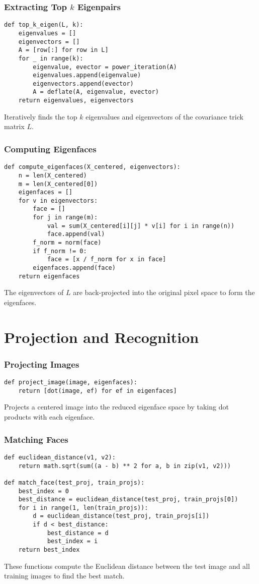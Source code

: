 \documentclass{beamer}
\begin{document}
\begin{frame}[fragile]
  \frametitle{Extracting Top \(k\) Eigenpairs}
  \begin{lstlisting}
def top_k_eigen(L, k):
    eigenvalues = []
    eigenvectors = []
    A = [row[:] for row in L]
    for _ in range(k):
        eigenvalue, evector = power_iteration(A)
        eigenvalues.append(eigenvalue)
        eigenvectors.append(evector)
        A = deflate(A, eigenvalue, evector)
    return eigenvalues, eigenvectors
  \end{lstlisting}
  Iteratively finds the top \(k\) eigenvalues and eigenvectors of the covariance trick matrix \(L\).
\end{frame}

\begin{frame}[fragile]
  \frametitle{Computing Eigenfaces}
  \begin{lstlisting}
def compute_eigenfaces(X_centered, eigenvectors):
    n = len(X_centered)
    m = len(X_centered[0])
    eigenfaces = []
    for v in eigenvectors:
        face = []
        for j in range(m):
            val = sum(X_centered[i][j] * v[i] for i in range(n))
            face.append(val)
        f_norm = norm(face)
        if f_norm != 0:
            face = [x / f_norm for x in face]
        eigenfaces.append(face)
    return eigenfaces
  \end{lstlisting}
  The eigenvectors of \(L\) are back-projected into the original pixel space to form the eigenfaces.
\end{frame}

\section{Projection and Recognition}

\begin{frame}[fragile]
  \frametitle{Projecting Images}
  \begin{lstlisting}
def project_image(image, eigenfaces):
    return [dot(image, ef) for ef in eigenfaces]
  \end{lstlisting}
  Projects a centered image into the reduced eigenface space by taking dot products with each eigenface.
\end{frame}

\begin{frame}[fragile]
  \frametitle{Matching Faces}
  \begin{lstlisting}
def euclidean_distance(v1, v2):
    return math.sqrt(sum((a - b) ** 2 for a, b in zip(v1, v2)))

def match_face(test_proj, train_projs):
    best_index = 0
    best_distance = euclidean_distance(test_proj, train_projs[0])
    for i in range(1, len(train_projs)):
        d = euclidean_distance(test_proj, train_projs[i])
        if d < best_distance:
            best_distance = d
            best_index = i
    return best_index
  \end{lstlisting}
  These functions compute the Euclidean distance between the test image and all training images to find the best match.
\end{frame}
\end{document}
